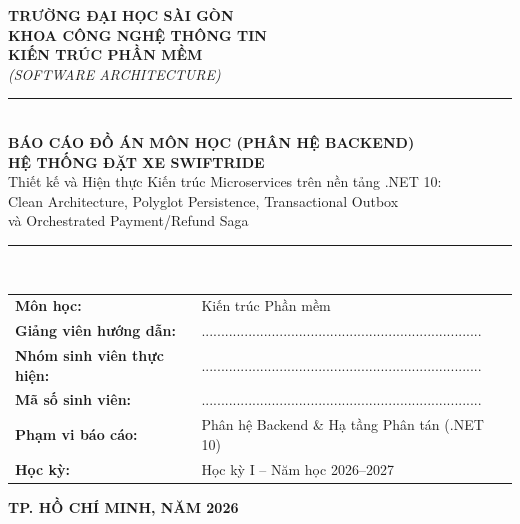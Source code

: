 \documentclass[12pt,a4paper]{article}
\begin{document}
\begin{titlepage}
    \centering
    \vspace*{0.6cm}
    {\Large \textbf{TRƯỜNG ĐẠI HỌC SÀI GÒN}}\\[0.25cm]
    {\large \textbf{KHOA CÔNG NGHỆ THÔNG TIN}}\\[2.0cm]

    {\Huge \textbf{KIẾN TRÚC PHẦN MỀM}}\\[0.3cm]
    {\large \textit{(SOFTWARE ARCHITECTURE)}}\\[0.5cm]
    \rule{\textwidth}{0.9pt}\\[0.55cm]
    {\Large \textbf{BÁO CÁO ĐỒ ÁN MÔN HỌC (PHÂN HỆ BACKEND)}}\\[0.4cm]
    {\Huge \textbf{HỆ THỐNG ĐẶT XE SWIFTRIDE}}\\[0.35cm]
    {\large Thiết kế và Hiện thực Kiến trúc Microservices trên nền tảng .NET 10:}\\
    {\large Clean Architecture, Polyglot Persistence, Transactional Outbox}\\
    {\large và Orchestrated Payment/Refund Saga}\\[0.55cm]
    \rule{\textwidth}{0.9pt}\\[1.6cm]

    \renewcommand{\arraystretch}{1.45}
    \begin{tabular}{ll}
        \textbf{Môn học:} & Kiến trúc Phần mềm \\
        \textbf{Giảng viên hướng dẫn:} & ........................................................................ \\
        \textbf{Nhóm sinh viên thực hiện:} & ........................................................................ \\
        \textbf{Mã số sinh viên:} & ........................................................................ \\
        \textbf{Phạm vi báo cáo:} & Phân hệ Backend \& Hạ tầng Phân tán (.NET 10) \\
        \textbf{Học kỳ:} & Học kỳ I -- Năm học 2026--2027 \\
    \end{tabular}
    \renewcommand{\arraystretch}{1.0}

    \vfill
    {\large \textbf{TP. HỒ CHÍ MINH, NĂM 2026}}
\end{titlepage}
\end{document}
